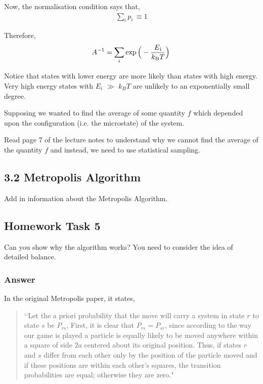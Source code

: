 \documentclass[12pt]{article}
\begin{document}
Now, the normalisation condition says that,
 \begin{align} 
\sum_{i}^{} p_{i}\, \equiv 1
\end{align}

Therefore, 
 \begin{align} 
A^{-1} = \sum_{i}^{} \exp \Big( - \frac{E\textsubscript{i}}{k\textsubscript{B} T}\Big)\,
\end{align}

Notice that states with lower energy are more likely than states with high energy. Very high energy
states with $E_{i}$ \(\gg\) $k_{B}T$ are unlikely to an exponentially small degree.

Supposing we wanted to find the average of some quantity $f$ which depended upon the configuration
(i.e. the microstate) of the system.

Read page 7 of the lecture notes to understand why we cannot find the average of the quantity $f$ and instead, we need to use statistical sampling.

\subsection*{3.2 Metropolis Algorithm}

Add in information about the Metropolis Algorithm.

\subsection*{Homework Task 5}

Can you show why the algorithm works? You need to consider the idea of detailed balance.

\subsubsection*{Answer}

In the original Metropolis paper, it states,

 \begin{quotation}
‘‘Let the a priori probability that the move will carry a system in state $r$ to state $s$ be $P_{r s}$, 
First, it is clear that $P_{r s} = P_{s r}$, since according to the way our game is played
a particle is equally likely to be moved anywhere within a square of side $2a$ centered about its 
original position. Thus, if states $r$ and $s$ differ from each other only by the position of the particle
 moved and if these positions are within each other's squares, the transition probabilities are equal; 
 otherwise they are zero."
 \end{quotation}
 
\end{document}
